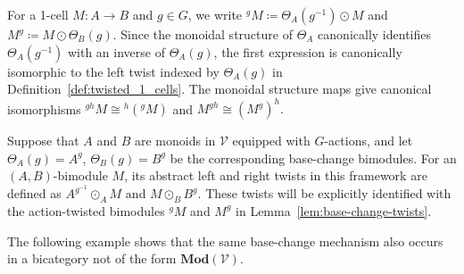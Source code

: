 \documentclass[11pt,oneside]{amsart}
\numberwithin{equation}{section}
\numberwithin{figure}{section}
\theoremstyle{plain}
\theoremstyle{definition}
\theoremstyle{remark}
\begin{document}
\begin{remark}\label{rem:twist_notation}
For a 1-cell \(M\colon A\to B\) and \(g\in G\), we write
\(
{}^gM\coloneqq\Theta_A(g^{-1})\odot M\) and
\(M^g\coloneqq M\odot\Theta_B(g).
\)
Since the monoidal structure of \(\Theta_A\) canonically identifies
\(\Theta_A(g^{-1})\) with an inverse of \(\Theta_A(g)\), the first
expression is canonically isomorphic to the left twist indexed by
\(\Theta_A(g)\) in Definition~\ref{def:twisted_1_cells}.
The monoidal structure maps give canonical isomorphisms
\(
{}^{gh}M\cong{}^h({}^gM)\) and \(
M^{gh}\cong(M^g)^h.
\)
\end{remark}

 
\begin{example}\label{ex:modv_twists}
Suppose that $A$ and $B$ are monoids in $\mathcal V$ equipped with $G$-actions, and let $\Theta_A(g) = A^g$, $\Theta_B(g) = B^g$ be the corresponding base-change bimodules. For an $(A,B)$-bimodule $M$, its abstract left and right twists in this framework are defined as $A^{g^{-1}}\odot_A M$ and $M\odot_B B^g$. These   twists will be explicitly identified with the action-twisted bimodules ${}^gM$ and $M^g$ in Lemma~\ref{lem:base-change-twists}.
\end{example}
 
 

The following example shows that the same base-change
mechanism also occurs in a bicategory not of the form
\(\mathbf{Mod}(\mathcal V)\).
\end{document}
